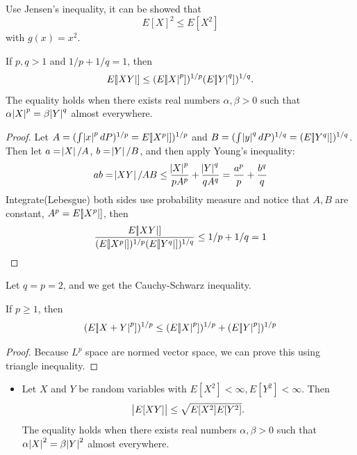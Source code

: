 \begin{refsection}
\begin{example}
	Use Jensen's inequality, it can be showed that
	$$E[X]^2 \leq E[X^2]$$ with $g(x) = x^2$.
\end{example}




\begin{theorem} 
\cite[319]{grimmett2001probability}\label{ch:theory-of-probability:th:HolderInequality}
If $p,q > 1$ and $1/p + 1/q = 1$, then
$$E[\abs{XY}] \leq (E[\abs{X}^p])^{1/p}(E[\abs{Y}^q])^{1/q}.$$
The equality holds when there exists real numbers $\alpha,\beta >0$ such that $\alpha \abs{X}^p = \beta \abs{Y}^q$  almost everywhere.
\end{theorem}
\begin{proof}
Let $A = (\int \abs{x}^pdP)^{1/p} = E[\abs{X^p}])^{1/p} $ and $B = (\int \abs{y}^qdP)^{1/q}=(E[\abs{Y^q}])^{1/q}$. Then let $a = \abs{X}/A$, $b = \abs{Y}/B$, and then apply Young's inequality:
$$ab = \abs{XY}/AB \leq \frac{\abs{X}^p}{pA^p} + \frac{\abs{Y}^q}{qA^q} = \frac{a^p}{p} + \frac{b^q}{q}$$
Integrate(Lebesgue) both sides use probability measure and notice that $A,B$ are constant, $A^p = E[\abs{X^p}]$, then
$$\frac{E[\abs{XY}]}{(E[\abs{X^p}])^{1/p}(E[\abs{Y^q}])^{1/q}} \leq 1/p+1/q =1$$	
\end{proof}

\begin{remark}
Let $q=p=2$, and we get the Cauchy-Schwarz inequality.
\end{remark}



\begin{theorem}
\cite[319]{grimmett2001probability}
If $p \geq 1$, then
$$(E[\abs{X+Y}^p])^{1/p} \leq (E[\abs{X}^p])^{1/p} + (E[\abs{Y}^p])^{1/p}$$
\end{theorem}
\begin{proof}
Because $L^p$ space are normed vector space, we can prove this using triangle inequality.	
\end{proof}

\begin{theorem}\cite{rosenthal2006first}\cite[187]{casella2002statistical}\cite{tripathi1999matrix}\label{ch:theory-of-probability:th:Cauchy-SchwarzInequality}\hfill
\begin{itemize}
	\item Let $X$ and $Y$ be random variables with $E[X^2] < \infty, E[Y^2]<\infty$. Then $$\abs{E[XY]}\leq \sqrt{E[X^2]E[Y^2]}.$$
	The equality holds when there exists real numbers $\alpha,\beta >0$ such that $\alpha \abs{X}^2 = \beta \abs{Y}^2$ almost everywhere.
	

\end{itemize}
\end{theorem}
\end{refsection}
